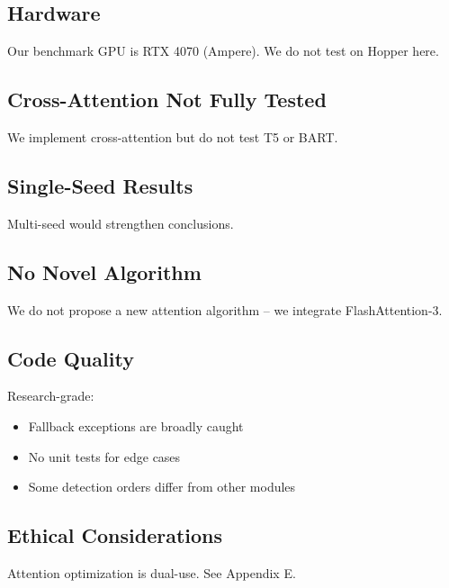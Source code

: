 \subsection{Hardware}

Our benchmark GPU is RTX 4070 (Ampere). We do not test on Hopper here.

\subsection{Cross-Attention Not Fully Tested}

We implement cross-attention but do not test T5 or BART.

\subsection{Single-Seed Results}

Multi-seed would strengthen conclusions.

\subsection{No Novel Algorithm}

We do not propose a new attention algorithm -- we integrate FlashAttention-3.

\subsection{Code Quality}

Research-grade:
\begin{itemize}
\item Fallback exceptions are broadly caught
\item No unit tests for edge cases
\item Some detection orders differ from other modules

\end{itemize}
\subsection{Ethical Considerations}

Attention optimization is dual-use. See Appendix E.

